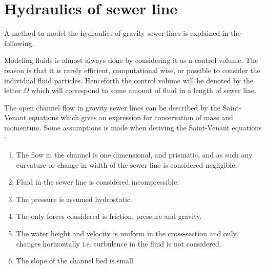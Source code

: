 ﻿\section{Hydraulics of sewer line}\label{se:hydraulics_of_sewer_line}
A method to model the hydraulics of gravity sewer lines is explained in the following. 

Modeling fluids is almost always done by considering it as a control volume. The reason is that it is rarely efficient, computational wise, or possible to consider the individual fluid particles.
Henceforth the control volume will be denoted by the letter $\Omega$ which will correspond to some amount of fluid in a length of sewer line.		

The open channel flow in gravity sewer lines can be described by the Saint-Venant equations which gives an expression for conservation of mass and momentum.
Some assumptions is made when deriving the Saint-Venant equations \cite{schutze2011modelling}:

\begin{table}[H]
\begin{enumerate}
\item The flow in the channel is one dimensional, and prismatic, and as such any curvature or change in width of the sewer line is considered negligible.
\item Fluid in the sewer line is considered incompressible. 
\item The pressure is assumed hydrostatic.
\item The only forces considered is friction, pressure and gravity.
\item The water height and velocity is uniform in the cross-section and only changes horizontally i.e. turbulence in the fluid is not considered.
\item The slope of the channel bed is small
\end{enumerate}
\label{tab:saintbernard_assumptions}
\end{table}

